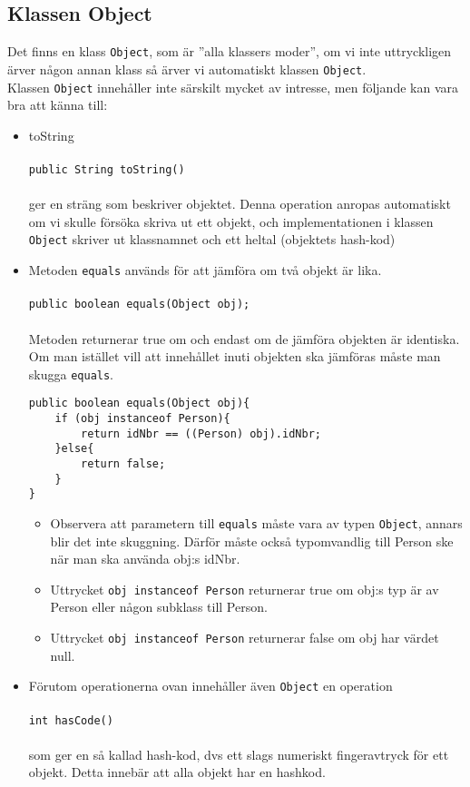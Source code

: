 \documentclass[11pt]{article}
\begin{document}
\subsection{Klassen Object}
Det finns en klass \verb+Object+, som är ''alla klassers moder'', om vi inte uttryckligen ärver någon annan klass så ärver vi automatiskt klassen \verb+Object+. \\
Klassen \verb+Object+ innehåller inte särskilt mycket av intresse, men följande kan vara bra att känna till:
\begin{itemize}
\item{toString \\ \\
	\verb+public String toString()+ \\ \\
	ger en sträng som beskriver objektet. Denna operation anropas automatiskt om vi skulle försöka skriva ut ett objekt, och implementationen i klassen \verb+Object+ skriver ut klassnamnet och ett heltal (objektets hash-kod)}

\item{Metoden \verb+equals+ används för att jämföra om två objekt är lika. \\ \\
	\verb+public boolean equals(Object obj);+ \\ \\
	Metoden returnerar true om och endast om de jämföra objekten är identiska. Om man istället vill att innehållet inuti objekten ska jämföras måste man skugga \verb+equals+.
	\begin{lstlisting}
public boolean equals(Object obj){
	if (obj instanceof Person){
		return idNbr == ((Person) obj).idNbr;
	}else{
		return false;
	}
}
	\end{lstlisting}
	\begin{itemize}
	\item{Observera att parametern till \verb+equals+ måste vara av typen \verb+Object+, annars blir det inte skuggning. Därför måste också typomvandlig till Person ske när man ska använda obj:s idNbr. }
	\item{Uttrycket \verb+obj instanceof Person+ returnerar true om obj:s typ är av Person eller någon subklass till Person.}
	\item{Uttrycket \verb+obj instanceof Person+ returnerar false om obj har värdet null.}
	\end{itemize}
	}

\item{Förutom operationerna ovan innehåller även \verb+Object+ en operation \\ \\
	\verb+int hasCode()+ \\ \\
		som ger en så kallad hash-kod, dvs ett slags numeriskt fingeravtryck för ett objekt. Detta innebär att alla objekt har en hashkod.}
	
\end{itemize}
\end{document}
